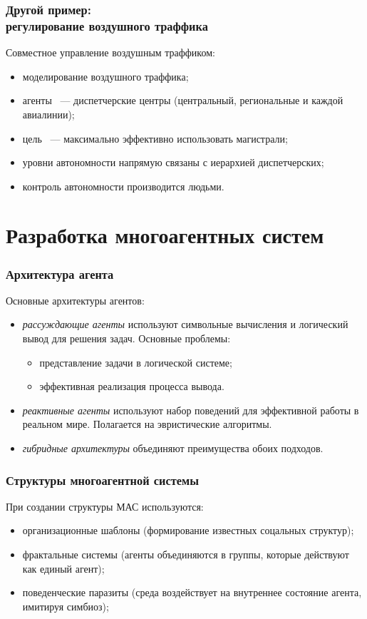 \documentclass{beamer}
\begin{document}
\begin{frame}
  \frametitle{Другой пример: \\ регулирование воздушного траффика}
  Совместное управление воздушным траффиком:
  \begin{itemize}
    \item моделирование воздушного траффика;
    \item агенты ~--- диспетчерские центры (центральный, региональные и каждой авиалинии);
    \item цель ~--- максимально эффективно использовать магистрали;
    \item уровни автономности напрямую связаны с иерархией диспетчерских;
    \item контроль автономности производится людьми.
  \end{itemize}
\end{frame}

\section{Разработка многоагентных систем}

\begin{frame}
  \frametitle{Архитектура агента}
  Основные архитектуры агентов:
  \begin{itemize}
    \item {\it рассуждающие агенты} используют символьные вычисления
      и логический вывод для решения задач. Основные проблемы:
      \begin{itemize}
        \item представление задачи в логической системе;
        \item эффективная реализация процесса вывода.
      \end{itemize}
    \item {\it реактивные агенты} используют набор поведений для
      эффективной работы в реальном мире. Полагается на эвристические
      алгоритмы.
    \item {\it гибридные архитектуры} объединяют преимущества обоих подходов.
  \end{itemize}
\end{frame}

\begin{frame}
  \frametitle{Структуры многоагентной системы}
  При создании структуры МАС используются:
  \begin{itemize}
    \item организационные шаблоны (формирование известных
      соцальных структур);
    \item фрактальные системы (агенты объединяются в группы,
      которые действуют как единый агент);
    \item поведенческие паразиты (среда воздействует на
      внутреннее состояние агента, имитируя симбиоз);
  \end{itemize}
\end{frame}
\end{document}
